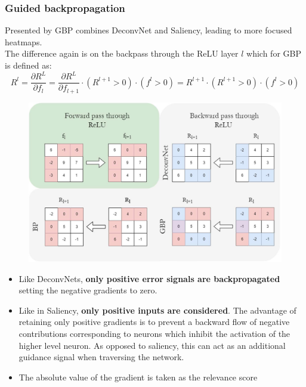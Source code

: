 \subsubsection{Guided backpropagation}
Presented by \cite{DBLP:journals/corr/SpringenbergDBR14} GBP combines DeconvNet and Saliency, leading to more
focused heatmaps.\\
The difference again is on the backpass through the ReLU layer $l$ which for GBP is defined as:
\begin{equation*}
    R^l=\frac{\partial R^{L}}{\partial f_l}=\frac{\partial R^{L}}{\partial f_{l+1}}\cdot (R^{l+1}>0)\cdot (f^{l}>0)=R^{l+1}\cdot (R^{l+1}>0)\cdot (f^{l}>0)
\end{equation*}
\begin{minipage}{0.55\textwidth}
    \begin{figure}[H]
        \includegraphics[width=\textwidth]{img/guided_backprop.png}
        \centering
    \end{figure}    
\end{minipage}
\hfill
\begin{minipage}{0.4\textwidth}
    \begin{itemize}
        \item Like DeconvNets, \textbf{only positive error signals are backpropagated} setting the negative gradients to zero.
        \item Like in Saliency, \textbf{only positive inputs are considered}. The advantage of retaining only positive gradients is to prevent a backward flow of negative contributions corresponding to neurons which inhibit the
        activation of the higher level neuron. As opposed to saliency, this can act as an additional guidance signal when traversing the network.
        \item The absolute value of the gradient is taken as the relevance score
    \end{itemize}
\end{minipage}

